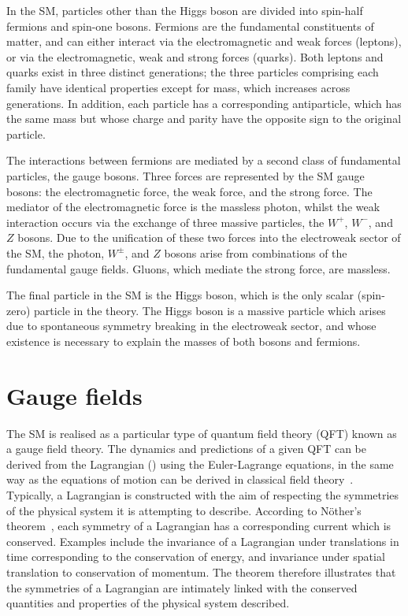 In the SM, particles other than the Higgs boson are divided into spin-half fermions
and spin-one bosons.
Fermions are the fundamental constituents of matter, 
and can either interact via the electromagnetic and weak forces (leptons), 
or via the electromagnetic, weak and strong forces (quarks).
Both leptons and quarks exist in three distinct generations;
the three particles comprising each family have identical properties 
except for mass, which increases across generations.
In addition, each particle has a corresponding antiparticle, 
which has the same mass but whose charge and parity have the opposite sign to the original particle.

The interactions between fermions are mediated by a second class of fundamental particles, 
the gauge bosons.
Three forces are represented by the SM gauge bosons: 
the electromagnetic force, the weak force, and the strong force.
The mediator of the electromagnetic force is the massless photon, 
whilst the weak interaction occurs via the exchange of three massive particles, 
the $W^+$, $W^-$, and $Z$ bosons.
Due to the unification of these two forces into the electroweak sector of the SM, 
the photon, $W^\pm$, and $Z$ bosons arise from combinations of the fundamental gauge fields.
Gluons, which mediate the strong force, 
are massless.

The final particle in the SM is the Higgs boson, 
which is the only scalar (spin-zero) particle in the theory.
The Higgs boson is a massive particle which arises 
due to spontaneous symmetry breaking in the electroweak sector, 
and whose existence is necessary to explain the masses of both bosons and fermions.

\section{Gauge fields}
\label{sec:theory_gauges}

The SM is realised as a particular type of quantum field theory (QFT) known as a gauge field theory.
The dynamics and predictions of a given QFT can be derived from the Lagrangian (\Like)
using the Euler-Lagrange equations, 
in the same way as the equations of motion can be derived in classical field theory~\cite{Peskin}.
Typically, a Lagrangian is constructed with the aim of respecting the symmetries 
of the physical system it is attempting to describe.
According to N\"other's theorem~\cite{Nother}, 
each symmetry of a Lagrangian has a corresponding current which is conserved.
Examples include the invariance of a Lagrangian under translations in time 
corresponding to the conservation of energy, 
and invariance under spatial translation to conservation of momentum.
The theorem therefore illustrates that the symmetries of a Lagrangian 
are intimately linked with the conserved quantities and properties of the physical system described.

